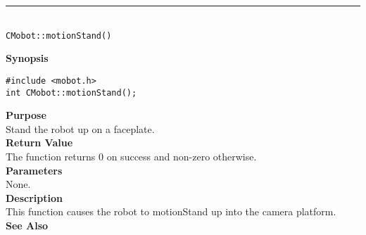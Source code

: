 \noindent
\vspace{5pt}
\rule{4.5in}{0.015in}\\
\noindent
{\LARGE \texttt{CMobot::motionStand()}}\\
{}

\noindent
{\bf Synopsis}\\
\begin{verbatim}
#include <mobot.h>
int CMobot::motionStand();
\end{verbatim}

\noindent
{\bf Purpose}\\
Stand the robot up on a faceplate.\\

\noindent
{\bf Return Value}\\
The function returns 0 on success and non-zero otherwise.\\

\noindent
{\bf Parameters}\\
None.\\

\noindent
{\bf Description}\\
This function causes the robot to motionStand up into the camera platform.\\

\noindent
{\bf See Also}\\

